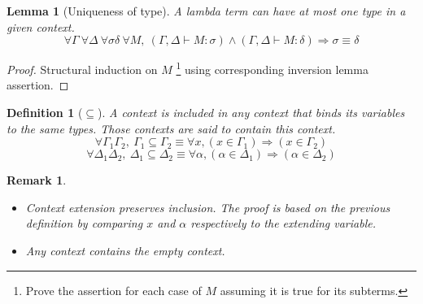 \documentclass{article}
\newtheorem{lemma}[theorem]{Lemma}
\newtheorem*{remark}{Remark}
\newtheorem{definition}{Definition}[section]
\begin{document}
    \begin{lemma}[Uniqueness of type]\label{uniqueness of type}
        A lambda term can have at most one type in a given context.
        $$\forall\Gamma\ \forall\Delta\ \forall\sigma\delta\ \forall M,\ (\Gamma,\Delta \vdash M : \sigma) \wedge (\Gamma,\Delta \vdash M : \delta) \Rightarrow \sigma \equiv \delta$$
    \end{lemma}
    
    \begin{proof}
        Structural induction on $M$ 
        \footnote{Prove the assertion for each case of $M$ assuming it is true for its subterms.}
        using corresponding inversion lemma assertion.
    \end{proof}

    \begin{definition}[$\subseteq$]\label{subseteq}
    A context is included in any context that binds its variables to the same types. Those contexts are said to contain this context.
        $$\forall \Gamma_1\Gamma_2, \ \Gamma_1\subseteq\Gamma_2 \equiv \forall x, (x \in \Gamma_1) \Rightarrow (x \in \Gamma_2)$$
        $$\forall \Delta_1\Delta_2, \ \Delta_1\subseteq\Delta_2 \equiv \forall \alpha, (\alpha \in \Delta_1) \Rightarrow (\alpha \in\Delta_2)$$
    \end{definition}

    \begin{remark}
        \begin{itemize}\label{included_inUpdate}
            \item Context extension preserves inclusion. The proof is based on the previous definition by comparing $x$ and $\alpha$ respectively to the extending variable.
            \item \label{empty_weakening}Any context contains the empty context.
        \end{itemize}
    \end{remark}
\end{document}
